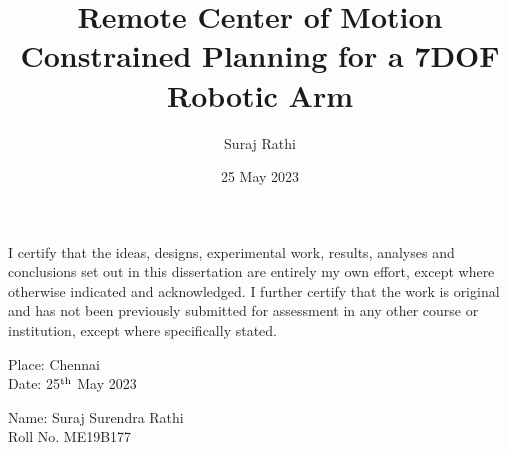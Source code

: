 \documentclass[BTech]{iitmdiss}
\begin{document}
    \newcommand{\titleText}{Remote Center of Motion Constrained Planning for a 7DOF Robotic Arm}
    \newcommand{\authorText}{Suraj Rathi}
    \title{\titleText}

    \author{\authorText}

    \date{25 May 2023}

    \maketitle

    \declaration

    \vspace*{0.5in}

    \noindent I certify that the ideas, designs, experimental work, results, analyses and conclusions set out in this
    dissertation are entirely my own effort, except where otherwise indicated and acknowledged.
    I further certify that the work is original and has not been previously submitted for assessment in
    any other course or institution, except where specifically stated.

    \vspace*{1.5in}


    \begin{paracol}{2}
        \begin{singlespacing}
            \hspace*{-0.25in}
            \parbox{2.5in}{
                \noindent Place: Chennai\\
                Date: 25$^{\textnormal{th}}$ May 2023
            }
        \end{singlespacing}

        \switchcolumn
        \begin{singlespacing}
            \hspace*{-0.25in}
            \parbox{2.5in}{
                \noindent Name: Suraj Surendra Rathi \\
                \noindent Roll No. ME19B177
            }


        \end{singlespacing}

    \end{paracol}
\end{document}
